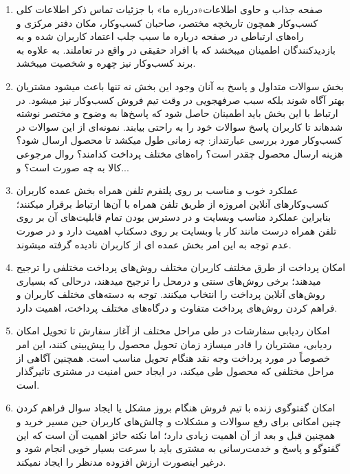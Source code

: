 \documentclass[14pt]{article}
\begin{document}
\begin{flushright}
\begin{enumerate}
\item صفحه جذاب و حاوی اطلاعات«درباره ما» با جزئیات تماس
\newline
ذکر اطلاعات کلی کسب‌وکار همچون تاریخچه مختصر، صاحبان کسب‌وکار، مکان دفتر مرکزی و راه‌های ارتباطی در صفحه درباره ما سبب جلب اعتماد کاربران شده و به بازدیدکنندگان اطمینان میبخشد که با افراد حقیقی در واقع در تعاملند. به علاوه به برند کسب‌وکار نیز چهره و شخصیت میبخشد.
\item بخش سوالات متداول و پاسخ به آنان
\newline
وجود این بخش نه تنها باعث میشود مشتریان بهتر آگاه شوند بلکه سبب صرفهجویی در وقت تیم فروش کسب‌وکار نیز میشود. در ارتباط با این بخش باید اطمینان حاصل شود که پاسخ‌ها به وضوح و مختصر نوشته شدهاند تا کاربران پاسخ سوالات خود را به راحتی بیابند. نمونه‌ای از این سوالات در کسب‌وکار مورد بررسی عبارتنداز: چه زمانی طول میکشد تا محصول ارسال شود؟ هزینه ارسال محصول چقدر است؟ راه‌های مختلف پرداخت کدامند؟ روال مرجوعی کالا به چه صورت است؟ و...
\item عملکرد خوب و مناسب بر روی پلتفرم تلفن همراه
\newline
بخش عمده کاربران کسب‌وکارهای آنلاین امروزه از طریق تلفن همراه با آن‌ها ارتباط برقرار میکنند؛ بنابراین عملکرد مناسب وبسایت و در دسترس بودن تمام قابلیت‌های آن بر روی تلفن همراه درست مانند کار با وبسایت بر روی دسکتاپ اهمیت دارد و در صورت عدم توجه به این امر بخش عمده ای از کاربران نادیده گرفته میشوند.
\item امکان پرداخت از طرق مخلتف
\newline
کاربران مختلف روش‌های پرداخت مختلفی را ترجیح میدهند؛ برخی روش‌های سنتی و درمحل را ترجیح میدهند، درحالی که بسیاری روش‌های آنلاین پرداخت را انتخاب میکنند. توجه به دسته‌های مختلف کاربران و فراهم کردن روش‌های پرداخت متفاوت و درگاه‌های مختلف پرداخت،‌ اهمیت دارد.
\item امکان ردیابی سفارشات در طی مراحل مختلف از آغاز سفارش تا تحویل
\newline
امکان ردیابی، مشتریان را قادر میسازد زمان تحویل محصول را پیش‌بینی کنند، این امر خصوصاً در مورد پرداخت وجه نقد هنگام تحویل مناسب است. همچنین آگاهی از مراحل مختلفی که محصول طی میکند، در ایجاد حس امنیت در مشتری تاثیرگذار است.
\item امکان گفتوگوی زنده با تیم فروش هنگام بروز مشکل یا ایجاد سوال
\newline
فراهم کردن چنین امکانی برای رفع سوالات و مشکلات و چالش‌های کاربران حین مسیر خرید و همچنین قبل و بعد از آن اهمیت زیادی دارد؛ اما نکته حائز اهمیت آن است که این گفتوگو و پاسخ و خدمت‌رسانی به مشتری باید با سرعت بسیار خوبی انجام شود و درغیر اینصورت ارزش افزوده مدنظر را ایجاد نمیکند.

\end{enumerate}
\end{flushright}
\end{document}
